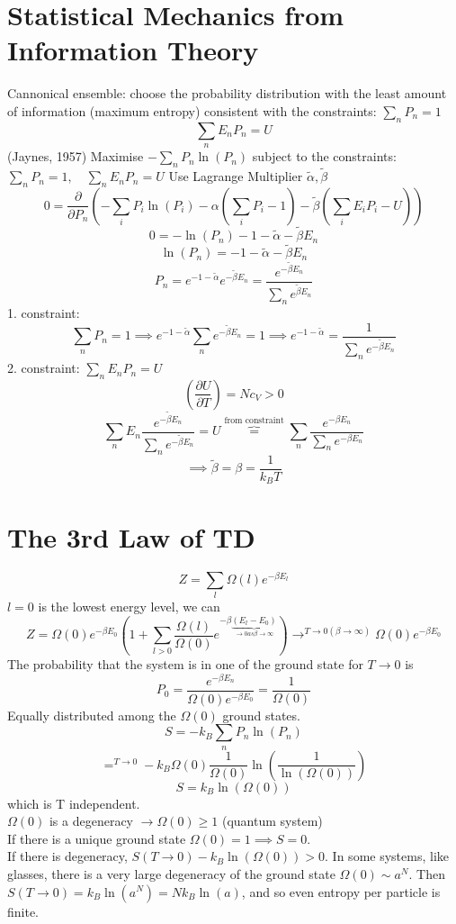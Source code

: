\documentclass[11pt]{book}
\theoremstyle{definition}
\begin{document}
\section{Statistical Mechanics from Information Theory}
Cannonical ensemble: choose the probability distribution with the least amount of information (maximum entropy) consistent with the constraints: $ \sum_n P_n = 1 $ 
\[ \sum_n E_nP_n = U \] 
(Jaynes, 1957)
Maximise $ -\sum_n P_n \ln(P_n)  $ 
subject to the constraints: $ \sum_n P_n = 1, \quad \sum_n E_n P_n = U $
Use Lagrange Multiplier $ \tilde \alpha, \tilde \beta $ 
\[ 0 = \frac{\partial }{\partial P_n} \left( -\sum_i P_i \ln(P_i) - \alpha (\sum_i P_i -1) - \tilde \beta(\sum_i E_i P_i - U) \right)  \] 
\[ 0 = -\ln(P_n) -1 -\tilde \alpha - \tilde \beta E_n \] 
\[ \ln(P_n) = -1 -\tilde \alpha -\tilde \beta E_n \] 
\[ P_n = e^{-1-\tilde \alpha} e^{-\tilde \beta E_n}= \frac{e^{-\tilde \beta E_n}}{\sum_n e^{\tilde \beta E_n}} \] 
1. constraint:
\[ \sum_n P_n = 1 \implies e^{-1-\tilde \alpha }\sum_n e^{-\tilde \beta E_n} = 1 \implies e^{-1-\tilde \alpha} = \frac{1}{\sum_n e^{-\tilde \beta E_n}} \] 
2. constraint: $ \sum_n E_n P_n =U $ 
\[ \left( \frac{\partial U}{\partial T} \right) = Nc_V > 0  \] 
\[ \sum_n E_n  \frac{e^{-\tilde \beta E_n}}{\sum_n e^{-\tilde \beta E_n}} = 
U \overbrace{=}^{\text{from constraint}}
\sum_n \frac{e^{-\beta E_n}}{\sum_n e^{-\beta E_n}}\] 
\[ \implies \tilde \beta = \beta = \frac{1}{k_BT}  \] 

\section{The 3rd Law of TD}
\[ Z = \sum_l \Omega(l) e^{-\beta E_l}\] 
$ l=0 $ is the lowest energy level, we can
\[ Z = \Omega(0) e^{-\beta E_0} 
\left(1+\sum_{l>0} \frac{\Omega(l)}{\Omega(0)} e^{-\beta 
\underbrace{(E_l - E_0)}_{\to 0 as \beta \to \infty}}
\right) \to^{T \to 0 (\beta \to \infty)} \Omega(0)e^{-\beta E_0} \] 
The probability that the system is in one of the ground state for $ T \to 0 $ is 
\[ P_0 = \frac{e^{-\beta E_n}}{\Omega(0)e^{-\beta E_0}} = \frac{1}{\Omega(0)} \] 
Equally distributed among the $ \Omega(0) $ ground states. 
\[ S = -k_B \sum_{n} P_n \ln(P_n)  \] 
\[ =^{T \to 0} -k_B \Omega(0) \frac{1}{\Omega(0)} \ln(\frac{1}{\ln(\Omega(0)) })  \] 
\[ S = k_B\ln(\Omega(0))  \] which is T independent. \\
$ \Omega(0) $ is a degeneracy $ \to \Omega(0) \geq 1$  (quantum system)\\
If there is a unique ground state $ \Omega(0) = 1 \implies S = 0$. \\
If there is degeneracy, $ S(T \to 0) - k_B \ln(\Omega(0)) > 0 $. In some systems, like glasses, there is a very large degeneracy of the ground state $ \Omega(0) \sim a^{N} $. Then $ S(T \to 0) =  k_B\ln(a^{N}) = Nk_B\ln(a) $, and so even entropy per particle is finite. 
\end{document}
